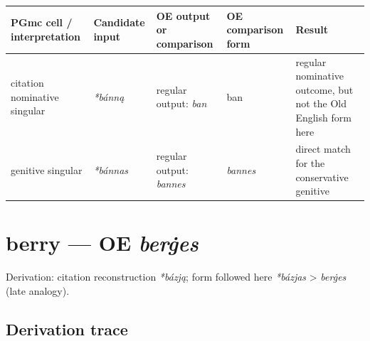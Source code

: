 \documentclass[
  british,
  a4paper,
  openany]{book}
\newcounter{none} %
\providecommand{\texorpdfstring}[2]{#1}
\begin{document}
{\def\LTcaptype{none} %
\begin{longtable}[]{@{}
  >{\raggedright\arraybackslash}p{}
  >{\raggedright\arraybackslash}p{}
  >{\raggedright\arraybackslash}p{}
  >{\raggedright\arraybackslash}p{}
  >{\raggedright\arraybackslash}p{}@{}}
\toprule\noalign{}
\begin{minipage}[b]{\linewidth}\raggedright
PGmc cell / interpretation
\end{minipage} & \begin{minipage}[b]{\linewidth}\raggedright
Candidate input
\end{minipage} & \begin{minipage}[b]{\linewidth}\raggedright
OE output or comparison
\end{minipage} & \begin{minipage}[b]{\linewidth}\raggedright
OE comparison form
\end{minipage} & \begin{minipage}[b]{\linewidth}\raggedright
Result
\end{minipage} \\
\midrule\noalign{}
\endhead
\bottomrule\noalign{}
\endlastfoot
citation nominative singular & {\emph{*bánną}} & regular output:
{\emph{ban}} & ban & regular nominative outcome, but not the Old English
form here \\
genitive singular & {\emph{*bánnas}} & regular output: \emph{bannes} &
{\emph{bannes}} & direct match for the conservative genitive \\
\end{longtable}
}

\section{\texorpdfstring{berry --- OE
\emph{berġes}}{berry --- OE berġes}}\label{berry-oe-berux121es}


Derivation: citation reconstruction \emph{*bázją}; form followed here
\emph{*bázjas} \textgreater{} \emph{berġes} (late analogy).

\subsection{Derivation trace}\label{derivation-trace-109}
\end{document}
